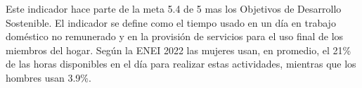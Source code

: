 Este indicador hace parte de la meta 5.4 de 5 mas los Objetivos de Desarrollo Sostenible. El indicador se define como el tiempo usado en un día en trabajo doméstico no remunerado y en la provisión de servicios para el uso final de los miembros del hogar.
Según la ENEI 2022 las mujeres usan, en promedio, el 21\% de las horas disponibles en el día para realizar estas actividades, mientras que los hombres usan 3.9\%.